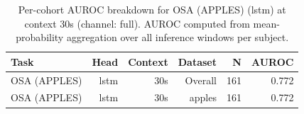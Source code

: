\begin{table}[ht]
\centering
\caption{Per-cohort AUROC breakdown for OSA (APPLES) (lstm) at context 30s (channel: full). AUROC computed from mean-probability aggregation over all inference windows per subject.}
\label{tab:cohort_osa_binary_apples_postqc_lstm_full}
\begin{tabular}{lrrrrr}
\toprule
Task & Head & Context & Dataset & N & AUROC \\
\midrule
OSA (APPLES) & lstm & 30s & Overall & 161 & 0.772 \\
OSA (APPLES) & lstm & 30s & apples & 161 & 0.772 \\
\bottomrule
\end{tabular}
\end{table}